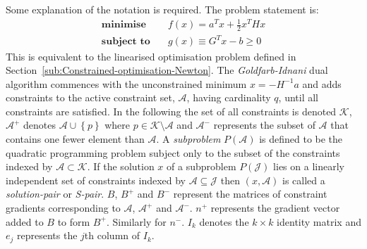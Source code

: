 \documentclass[a4paper,twoside,10pt,english]{report}
\begin{document}
Some explanation of the notation is required. The problem statement is:
\begin{align*}
\textbf{minimise}   \quad & f\left(x\right) = a^{T}x+\frac{1}{2}x^{T}Hx\\
\textbf{subject to} \quad & g\left(x\right) \equiv G^{T}x-b\ge0
\end{align*}
This is equivalent to the linearised optimisation problem defined
in Section~\ref{sub:Constrained-optimisation-Newton}. The 
\emph{Goldfarb-Idnani} dual algorithm commences with the unconstrained 
minimum $x=-H^{-1}a$ and adds constraints to the active constraint set, 
$\mathbb{\mathcal{A}}$, having cardinality $q$, until all constraints are 
satisfied. In the following the set of all constraints is denoted 
$\mathcal{K}$, $\mathcal{A}^{+}$ denotes $\mathcal{A}\cup\left\{ p\right\}$
where $p\in\mathcal{K}\setminus\mathcal{A}$
and $\mathcal{A}^{-}$ represents the subset of $\mathcal{A}$ that
contains one fewer element than $\mathcal{A}$. A \emph{subproblem}
$P\left(\mathcal{A}\right)$ is defined to be the quadratic programming
problem subject only to the subset of the constraints indexed by
$\mathcal{A}\subset\mathcal{K}$.
If the solution $x$ of a subproblem $P\left(\mathcal{J}\right)$
lies on a linearly independent set of constraints indexed by
$\mathcal{A}\subseteq\mathcal{J}$ then $\left(x,\mathcal{A}\right)$ is called
a \emph{solution-pair} or \emph{S-pair}. $B$, $B^{+}$ and $B^{-}$ represent the 
matrices of constraint gradients corresponding to $\mathcal{A}$, 
$\mathcal{A}^{+}$ and $\mathcal{A}^{-}$. $n^{+}$ represents the gradient vector 
added to $B$ to form $B^{+}$. Similarly for $n^{-}$. $I_{k}$ denotes the 
$k\times k$ identity matrix and $e_{j}$ represents the $j$th column of $I_{k}$.
\end{document}
